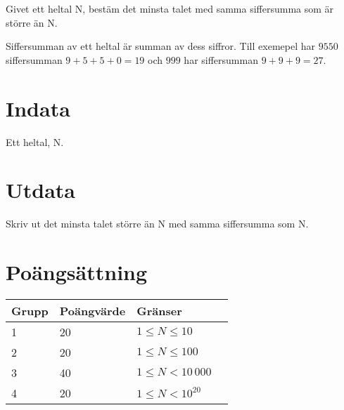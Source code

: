 
Givet ett heltal N, bestäm det minsta talet med samma siffersumma som är större än N.

Siffersumman av ett heltal är summan av dess siffror. Till exemepel har $9550$ siffersumman $9 + 5 + 5 + 0 = 19$ och $999$ har siffersumman $9 + 9 + 9 = 27$.

\section*{Indata}
Ett heltal, N.

\section*{Utdata}
Skriv ut det minsta talet större än N med samma siffersumma som N.

\section*{Poängsättning}

\begin{tabular}{| l | l | l | l |}
\hline
Grupp & Poängvärde & Gränser \\ \hline
1     & 20         & $1 \le N \le 10$ \\ \hline	
2     & 20         & $1 \le N \le 100$ \\ \hline	
3     & 40         & $1 \le N < 10\,000$ \\ \hline	
4     & 20         & $1 \le N < 10^{20}$ \\ \hline	
\end{tabular}
